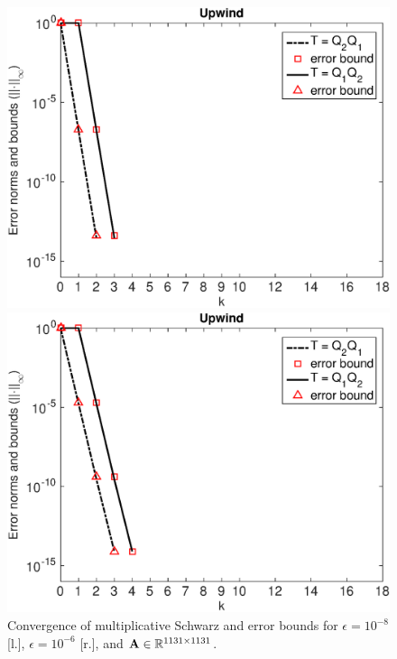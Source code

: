\begin{figure}[tbhp]
\hspace*{-0.5em}
\begin{minipage}[t]{0.5\linewidth}
\includegraphics[width=0.95\linewidth]{figures/mSm_upwind2D_eps_1e-08_N_30_M_40}
\vspace*{-1em}
\end{minipage}
%
\begin{minipage}[t]{0.5\linewidth}
\includegraphics[width=0.95\linewidth]{figures/mSm_upwind2D_eps_1e-06_N_30_M_40}
\vspace*{-1em}
\end{minipage}
\vspace*{-1em}
\caption{Convergence of multiplicative Schwarz and error bounds for $\epsilon=10^{-8}$ [l.], $\epsilon=10^{-6}$ [r.], and $\mathbf{A} \in \mathbb{R}^{1131\times1131}$.}\label{fig:2D:err1}
\end{figure}

